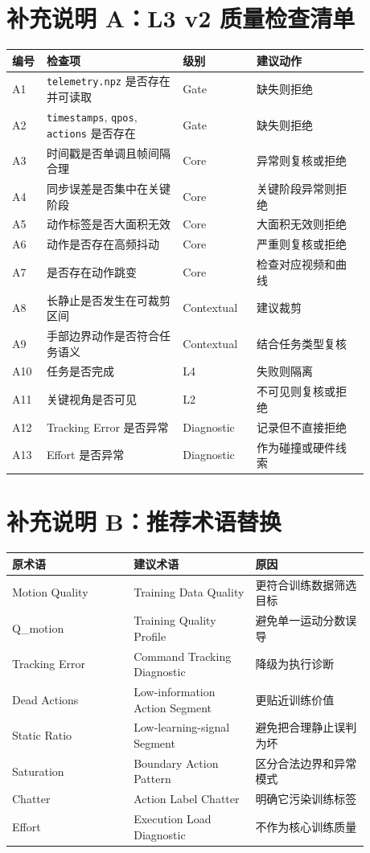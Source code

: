\documentclass[UTF8,zihao=-4,oneside,openany]{ctexrep}
\begin{document}
\section{补充说明 A：L3 v2 质量检查清单}

\begin{longtable}{p{0.08\linewidth}p{0.34\linewidth}p{0.18\linewidth}p{0.28\linewidth}}
\toprule
\textbf{编号} & \textbf{检查项} & \textbf{级别} & \textbf{建议动作} \\
\midrule
A1 & \texttt{telemetry.npz} 是否存在并可读取 & Gate & 缺失则拒绝 \\
A2 & \texttt{timestamps}, \texttt{qpos}, \texttt{actions} 是否存在 & Gate & 缺失则拒绝 \\
A3 & 时间戳是否单调且帧间隔合理 & Core & 异常则复核或拒绝 \\
A4 & 同步误差是否集中在关键阶段 & Core & 关键阶段异常则拒绝 \\
A5 & 动作标签是否大面积无效 & Core & 大面积无效则拒绝 \\
A6 & 动作是否存在高频抖动 & Core & 严重则复核或拒绝 \\
A7 & 是否存在动作跳变 & Core & 检查对应视频和曲线 \\
A8 & 长静止是否发生在可裁剪区间 & Contextual & 建议裁剪 \\
A9 & 手部边界动作是否符合任务语义 & Contextual & 结合任务类型复核 \\
A10 & 任务是否完成 & L4 & 失败则隔离 \\
A11 & 关键视角是否可见 & L2 & 不可见则复核或拒绝 \\
A12 & Tracking Error 是否异常 & Diagnostic & 记录但不直接拒绝 \\
A13 & Effort 是否异常 & Diagnostic & 作为碰撞或硬件线索 \\
\bottomrule
\end{longtable}

\section{补充说明 B：推荐术语替换}

\begin{longtable}{p{0.3\linewidth}p{0.3\linewidth}p{0.28\linewidth}}
\toprule
\textbf{原术语} & \textbf{建议术语} & \textbf{原因} \\
\midrule
Motion Quality & Training Data Quality & 更符合训练数据筛选目标 \\
Q\_motion & Training Quality Profile & 避免单一运动分数误导 \\
Tracking Error & Command Tracking Diagnostic & 降级为执行诊断 \\
Dead Actions & Low-information Action Segment & 更贴近训练价值 \\
Static Ratio & Low-learning-signal Segment & 避免把合理静止误判为坏 \\
Saturation & Boundary Action Pattern & 区分合法边界和异常模式 \\
Chatter & Action Label Chatter & 明确它污染训练标签 \\
Effort & Execution Load Diagnostic & 不作为核心训练质量 \\
\bottomrule
\end{longtable}
\end{document}
